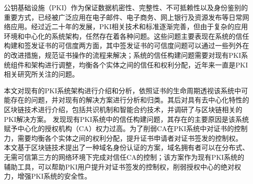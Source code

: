 
\begin{cabstract}





公钥基础设施（PKI）作为保证数据机密性、完整性、不可抵赖性以及身份鉴别的重要方式，已经被广泛应用在电子邮件、电子商务、网上银行及资源发布等日常网络应用。经过近二十年的发展，PKI相关技术和标准逐渐完善，但由于复杂的应用环境和中心化的系统架构，任然存在着各种问题。这些问题主要表现在系统的信任构建和签发证书的可信度两方面，其中签发证书的可信度问题可以通过一些列外在的改进措施，规范证书操作的流程来解决；系统的信任构建问题需要对现有PKI系统组件和架构进行调整，均衡各个实体之间的信任和权利分配，近年来一直是PKI相关研究所关注的问题。


本文对现有的PKI系统架构进行介绍和分析，依照证书的生命周期透视该系统中可能存在的问题，并对现有的解决方案进行分析和归类。其后对具有去中心化特性的区块链技术进行介绍，包括共识机制和智能合约技术，并调研了与区块链相关的PKI解决方案。
发现现有PKI系统中的信任构建问题，其存在的主要原因是该系统赋予中心化的授权机构（CA）权力过高。为了削弱CA在PKI系统中对证书的控制力，需要均衡各个实体之间的权利分配，提升证书申请者对证书签发的控制权。
本文基于区块链技术提出了一种域名身份认证的方案，域名拥有者可以在分布式、无需可信第三方的网络环境下完成对信任CA的控制；该方案作为现有PKI系统的辅助工具，可以帮助PKI用户提升对证书签发的控制权，削弱授权中心的绝对权力，增强PKI系统的安全性。


\end{cabstract}

